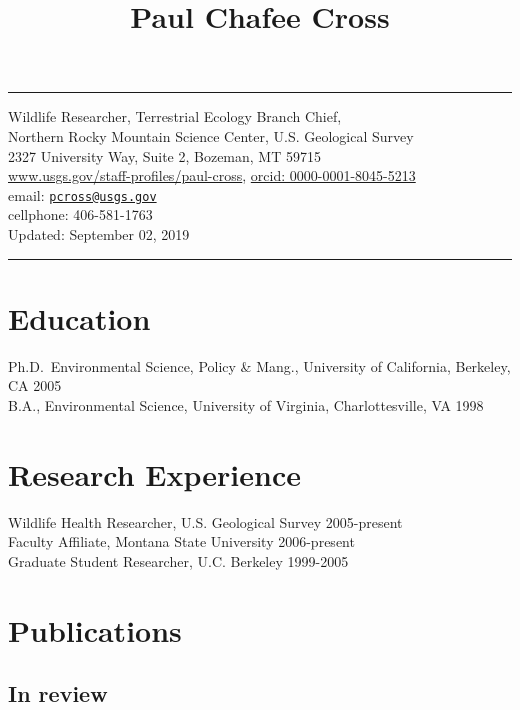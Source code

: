 \documentclass[12pt,]{article}
\title{Paul Chafee Cross}
\author{}
\date{}
\begin{document}
\maketitle

\hrule
\centering

Wildlife Researcher, Terrestrial Ecology Branch Chief,\\
Northern Rocky Mountain Science Center, U.S. Geological Survey\\
2327 University Way, Suite 2, Bozeman, MT 59715\\
\href{http://www.usgs.gov/staff-profiles/paul-cross}{www.usgs.gov/staff-profiles/paul-cross},
\href{http://orcid.org/0000-0001-8045-5213}{orcid:
0000-0001-8045-5213}\\
email: \href{mailto:pcross@usgs.gov}{\nolinkurl{pcross@usgs.gov}}\\
cellphone: 406-581-1763\\
Updated: September 02, 2019

\hrule

\raggedright

\hypertarget{education}{%
\section{Education}\label{education}}

Ph.D.~Environmental Science, Policy \& Mang., University of California,
Berkeley, CA \hfill 2005\\
B.A., Environmental Science, University of Virginia, Charlottesville, VA
\hfill 1998

\hypertarget{research-experience}{%
\section{Research Experience}\label{research-experience}}

Wildlife Health Researcher, U.S. Geological Survey \hfill 2005-present\\
Faculty Affiliate, Montana State University \hfill 2006-present\\
Graduate Student Researcher, U.C. Berkeley \hfill 1999-2005

\hypertarget{publications}{%
\section{Publications}\label{publications}}

\hypertarget{in-review}{%
\subsection{In review}\label{in-review}}
\end{document}
